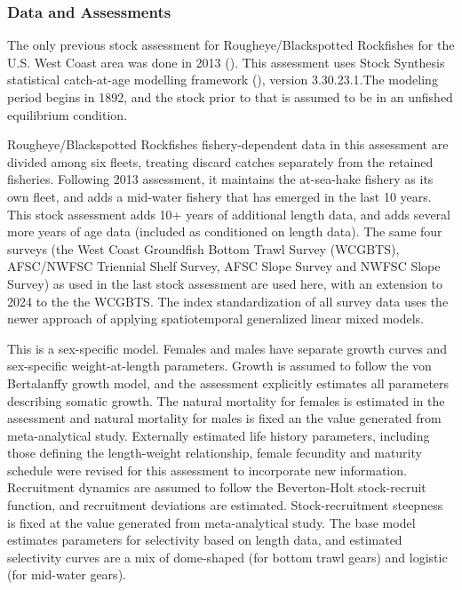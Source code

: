 \documentclass[
]{scrartcl}
\begin{document}
\subsubsection{Data and Assessments}\label{data-and-assessments}

The only previous stock assessment for Rougheye/Blackspotted Rockfishes
for the U.S. West Coast area was done in 2013
(). This
assessment uses Stock Synthesis statistical catch-at-age modelling
framework (),
version 3.30.23.1.The modeling period begins in 1892, and the stock
prior to that is assumed to be in an unfished equilibrium condition.

Rougheye/Blackspotted Rockfishes fishery-dependent data in this
assessment are divided among six fleets, treating discard catches
separately from the retained fisheries. Following 2013 assessment, it
maintains the at-sea-hake fishery as its own fleet, and adds a mid-water
fishery that has emerged in the last 10 years. This stock assessment
adds 10+ years of additional length data, and adds several more years of
age data (included as conditioned on length data). The same four surveys
(the West Coast Groundfish Bottom Trawl Survey (WCGBTS), AFSC/NWFSC
Triennial Shelf Survey, AFSC Slope Survey and NWFSC Slope Survey) as
used in the last stock assessment are used here, with an extension to
2024 to the the WCGBTS. The index standardization of all survey data
uses the newer approach of applying spatiotemporal generalized linear
mixed models.

This is a sex-specific model. Females and males have separate growth
curves and sex-specific weight-at-length parameters. Growth is assumed
to follow the von Bertalanffy growth model, and the assessment
explicitly estimates all parameters describing somatic growth. The
natural mortality for females is estimated in the assessment and natural
mortality for males is fixed an the value generated from meta-analytical
study. Externally estimated life history parameters, including those
defining the length-weight relationship, female fecundity and maturity
schedule were revised for this assessment to incorporate new
information. Recruitment dynamics are assumed to follow the
Beverton-Holt stock-recruit function, and recruitment deviations are
estimated. Stock-recruitment steepness is fixed at the value generated
from meta-analytical study. The base model estimates parameters for
selectivity based on length data, and estimated selectivity curves are a
mix of dome-shaped (for bottom trawl gears) and logistic (for mid-water
gears).
\end{document}
